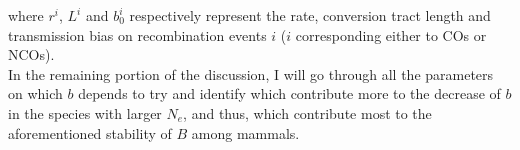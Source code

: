 \begin{mccorrection}
where $r^{i}$, $L^{i}$ and $b_0^{i}$ respectively represent the rate, conversion tract length and transmission bias on recombination events $i$ ($i$ corresponding either to COs or NCOs).\\

%
%
In the remaining portion of the discussion, I will go through all the parameters on which $b$ depends to try and identify which contribute more to the decrease of $b$ in the species with larger $N_e$, and thus, which contribute most to the aforementioned stability of $B$ among mammals.
\end{mccorrection}



